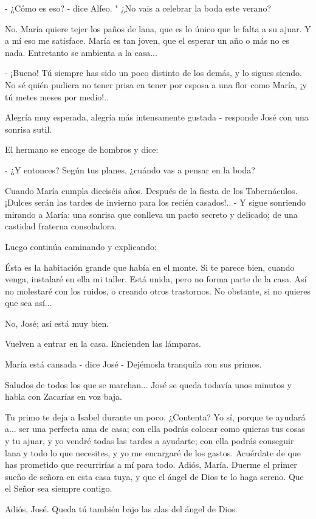 \documentclass[12pt]{book} %
\begin{document}
- ¿Cómo es eso? - dice Alfeo. " ¿No vais a celebrar la boda este verano? 

No. María quiere tejer los paños de lana, que es lo único que le falta a su ajuar. Y a mí eso me satisface. María es tan joven, que el esperar un año o más no es nada. Entretanto se ambienta a la casa... 

- ¡Bueno! Tú siempre has sido un poco distinto de los demás, y lo sigues siendo. No sé quién pudiera no tener prisa en tener por esposa a una flor como María, ¡y tú metes meses por medio!.. 

Alegría muy esperada, alegría más intensamente gustada - responde José con una sonrisa sutil. 

El hermano se encoge de hombros y dice: 

- ¿Y entonces? Según tus planes, ¿cuándo vas a pensar en la boda? 

Cuando María cumpla dieciséis años. Después de la fiesta de los Tabernáculos. ¡Dulces serán las tardes de invierno para los recién casados!.. - Y sigue sonriendo mirando a María: una sonrisa que conlleva un pacto secreto y delicado; de una castidad fraterna consoladora. 

Luego continúa caminando y explicando: 

Ésta es la habitación grande que había en el monte. Si te parece bien, cuando venga, instalaré en ella mi taller. Está unida, pero no forma parte de la casa. Así no molestaré con los ruidos, o creando otros trastornos. No obstante, si no quieres que sea así... 

No, José; así está muy bien. 

Vuelven a entrar en la casa. Encienden las lámparas. 

María está cansada - dice José - Dejémosla tranquila con sus primos. 

Saludos de todos los que se marchan... José se queda todavía unos minutos y habla con Zacarías en voz baja. 

Tu primo te deja a Isabel durante un poco. ¿Contenta? Yo sí, porque te ayudará a... ser una perfecta ama de casa; con ella podrás colocar como quieras tus cosas y tu ajuar, y yo vendré todas las tardes a ayudarte; con ella podrás conseguir lana y todo lo que necesites, y yo me encargaré de los gastos. Acuérdate de que has prometido que recurrirías a mí para todo. Adiós, María. Duerme el primer sueño de señora en esta casa tuya, y que el ángel de Dios te lo haga sereno. Que el Señor sea siempre contigo. 

Adiós, José. Queda tú también bajo las alas del ángel de Dios. 
\end{document}
